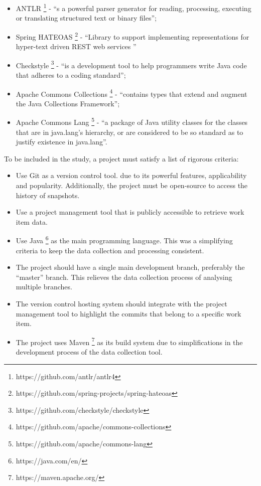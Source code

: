\documentclass{mpaper}
\begin{document}
\begin{itemize}
	\item ANTLR \footnote{https://github.com/antlr/antlr4} - ``s a powerful parser
	      generator for reading, processing, executing or translating structured text
	      or binary files'';
	\item Spring HATEOAS
	      \footnote{https://github.com/spring-projects/spring-hateoas} - ``Library to
	      support implementing representations for hyper-text driven REST web services
	      ''
	\item Checkstyle \footnote{https://github.com/checkstyle/checkstyle} - ``is a
	      development tool to help programmers write Java code that adheres to a coding
	      standard'';
	\item Apache Commons Collections
	      \footnote{https://github.com/apache/commons-collections} - ``contains types
	      that extend and augment the Java Collections Framework'';
	\item Apache Commons Lang \footnote{https://github.com/apache/commons-lang} -
	      ``a package of Java utility classes for the classes that are in java.lang's
	      hierarchy, or are considered to be so standard as to justify existence in
	      java.lang''.
\end{itemize}

To be included in the study, a project must satisfy a list of rigorous criteria:

\begin{itemize}
  \item Use Git as a version control tool. due to its powerful features,
  applicability and popularity. Additionally, the project must be open-source to
  access the history of snapshots.
  \item Use a project management tool that is publicly accessible to retrieve
  work item data.
  \item Use Java \footnote{https://java.com/en/} as the main programming
  language. This was a simplifying criteria to keep the data collection and
  processing consistent.
  \item The project should have a single main development branch, preferably the
  ``master'' branch. This relieves the data collection process of analysing
  multiple branches.
  \item The version control hosting system should integrate with the project
  management tool to highlight the commits that belong to a specific work item.
  \item The project uses Maven \footnote{https://maven.apache.org/} as its build
  system due to simplifications in the development process of the data collection
  tool.
\end{itemize}
\end{document}
